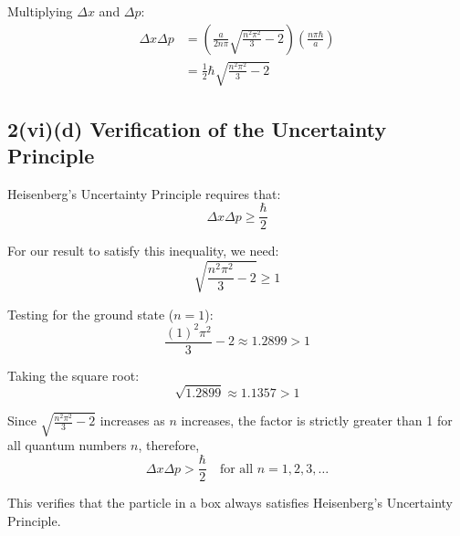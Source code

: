 \documentclass{article}
\begin{document}
Multiplying $\Delta x$ and $\Delta p$:
\begin{align*}
\Delta x \Delta p &= \left( \frac{a}{2n\pi} \sqrt{\frac{n^2\pi^2}{3} - 2} \right) \left( \frac{n\pi\hbar}{a} \right) \\
&= \frac{1}{2}\hbar \sqrt{\frac{n^2\pi^2}{3} - 2}
\end{align*}

\subsection*{2(vi)(d) Verification of the Uncertainty Principle}

Heisenberg's Uncertainty Principle requires that:
\begin{equation*}
\Delta x \Delta p \ge \frac{\hbar}{2}
\end{equation*}

For our result to satisfy this inequality, we need:
\begin{equation*}
\sqrt{\frac{n^2\pi^2}{3} - 2} \ge 1
\end{equation*}

Testing for the ground state ($n = 1$):
\begin{equation*}
\frac{(1)^2\pi^2}{3} - 2 \approx 1.2899 > 1
\end{equation*}

Taking the square root:
\begin{equation*}
\sqrt{1.2899} \approx 1.1357 > 1
\end{equation*}

Since $\sqrt{\frac{n^2\pi^2}{3} - 2}$ increases as $n$ increases, the factor is strictly greater than 1 for all quantum numbers $n$, therefore,
\begin{equation*}
\Delta x \Delta p > \frac{\hbar}{2} \quad \text{for all } n = 1, 2, 3, \dots
\end{equation*}

This verifies that the particle in a box always satisfies Heisenberg's Uncertainty Principle.
\end{document}
